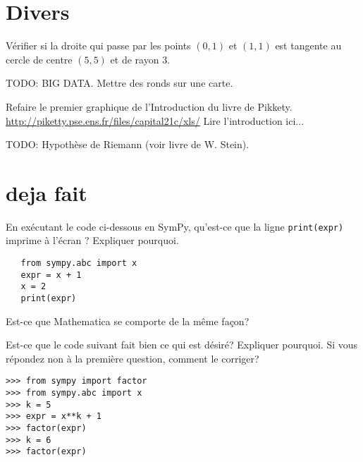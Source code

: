 
\section*{Divers}

\begin{exercice}
    Vérifier si la droite qui passe par les points $(0,1)$ et $(1,1)$ est
    tangente au cercle de centre $(5,5)$ et de rayon $3$.
\end{exercice}

\begin{exercice}
    TODO: BIG DATA. Mettre des ronds sur une carte.
\end{exercice}

\begin{exercice}
Refaire le premier graphique de l'Introduction du livre de Pikkety.
\url{http://piketty.pse.ens.fr/files/capital21c/xls/}
Lire l'introduction ici...
\end{exercice}

\begin{exercice}
    TODO: Hypothèse de Riemann (voir livre de W. Stein).
\end{exercice}


\section{deja fait}

\begin{exercice}
En exécutant le code ci-dessous en SymPy, qu'est-ce que la ligne
\texttt{print(expr)} imprime à l'écran ? Expliquer pourquoi.
\begin{verbatim}
   from sympy.abc import x
   expr = x + 1
   x = 2
   print(expr)
\end{verbatim}
Est-ce que Mathematica se comporte de la même façon?
\end{exercice}

\begin{exercice}
Est-ce que le code suivant fait bien ce qui est désiré? Expliquer pourquoi.
Si vous répondez non à la première question, comment le corriger?
\begin{verbatim}
>>> from sympy import factor
>>> from sympy.abc import x
>>> k = 5
>>> expr = x**k + 1
>>> factor(expr)
>>> k = 6
>>> factor(expr)
\end{verbatim}
\end{exercice}


